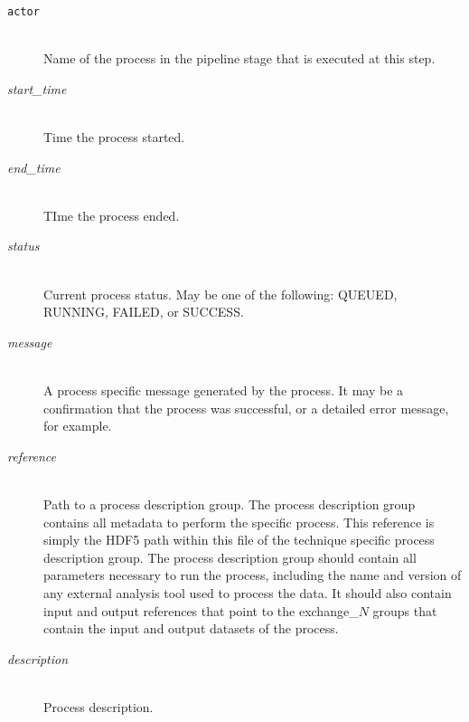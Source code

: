 \begin{description}

\item[\tt {actor}] \hfill \\
{Name of the process in the pipeline stage that is executed at this step.}

\item[\emph{start\_time}] \hfill \\
{Time the process started.}

\item[\emph{end\_time}] \hfill \\
{TIme the process ended.}

\item[\emph{status}] \hfill \\
{Current process status. May be one of the following: QUEUED, RUNNING, FAILED,
or SUCCESS.}

\item[\emph{message}] \hfill \\
{A process specific message generated by the process. It may be a confirmation
that the process was successful, or a detailed error message, for example.}

\item[\emph{reference}] \hfill \\
{Path to a process description group. The process description group contains all
metadata to perform the specific process. This reference is simply the
HDF5 path within this file of the technique specific process description group.
The process description group should contain all parameters necessary to run
the process, including the name and version of any external analysis tool
used to process the data. It should also contain input and output references
that point to the exchange\_$N$ groups that contain the input and output
datasets of the process.}

\item[\emph{description}] \hfill \\
{Process description.}

\end{description}





